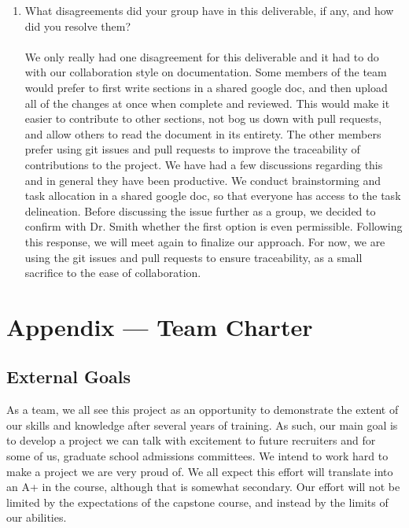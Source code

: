 \documentclass{article}
\begin{document}
\begin{enumerate}
    \item What disagreements did your group have in this deliverable, if any,
    and how did you resolve them?\\\\
    We only really had one disagreement for this deliverable and it had to do with our collaboration style on documentation. Some members of the team would prefer to 
    first write sections in a shared google doc, and then upload all of the changes at once when complete and reviewed. This would make it easier to contribute to 
    other sections, not bog us down with pull requests, and allow others to read the document in its entirety. The other members prefer using git issues and pull requests
    to improve the traceability of contributions to the project. We have had a few discussions regarding this and in general they have been productive. We conduct
    brainstorming and task allocation in a shared google doc, so that everyone has access to the task delineation. Before discussing the issue further as a group,
    we decided to confirm with Dr. Smith whether the first option is even permissible. Following this response, we will meet again to finalize our approach. For now, 
    we are using the git issues and pull requests to ensure traceability, as a small sacrifice to the ease of collaboration.
\end{enumerate}



\newpage{}

\section*{Appendix --- Team Charter}


\subsection*{External Goals}

As a team, we all see this project as an opportunity to demonstrate the extent of our skills and knowledge after several years of training.
As such, our main goal is to develop a project we can talk with excitement to future recruiters and for some of us, graduate school admissions committees.
We intend to work hard to make a project we are very proud of. We all expect this effort will translate into an A+ in the course, although that is somewhat
secondary. Our effort will not be limited by the expectations of the capstone course, and instead by the limits of our abilities.
\end{document}

